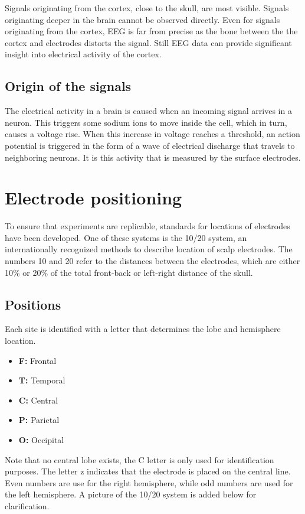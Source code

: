 \npar

Signals originating from the cortex, close to the skull, are most visible. Signals originating deeper in the brain cannot be observed directly. Even for signals originating from the cortex, EEG is far from precise as the bone between the the cortex and electrodes distorts the signal. Still EEG data can provide significant insight into electrical activity of the cortex.

\subsection{Origin of the signals}

The electrical activity in a brain is caused when an incoming signal arrives in a neuron. This triggers some sodium ions to move inside the cell, which in turn, causes a voltage rise\cite{ExtendedPaper}. When this increase in voltage reaches a threshold, an action potential is triggered in the form of a wave of electrical discharge that travels to neighboring neurons. It is this activity that is measured by the surface electrodes.

\section{Electrode positioning}
To ensure that experiments are replicable, standards for locations of electrodes have been developed. One of these systems is the 10/20 system, an internationally recognized methods to describe location of scalp electrodes\cite{TenTwentyManual}. The numbers 10 and 20 refer to the distances between the electrodes, which are either 10\% or 20\% of the total front-back or left-right distance of the skull.

\subsection{Positions}
Each site is identified with a letter that determines the lobe and hemisphere location.
\begin{itemize}
\item \textbf{F:} Frontal
\item \textbf{T:} Temporal
\item \textbf{C:} Central
\item \textbf{P:} Parietal
\item \textbf{O:} Occipital
\end{itemize}
Note that no central lobe exists, the C letter is only used for identification purposes. The letter z indicates that the electrode is placed on the central line. Even numbers are use for the right hemisphere, while odd numbers are used for the left hemisphere. A picture of the 10/20 system is added below for clarification.

